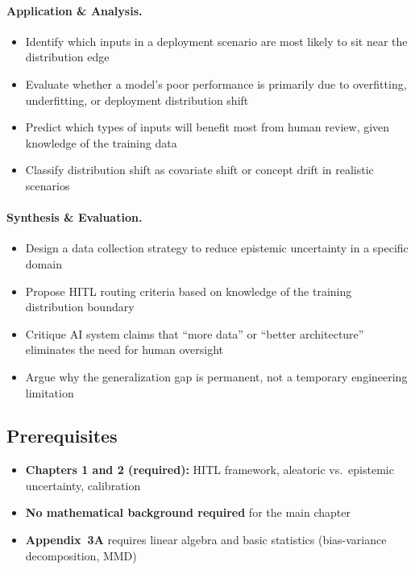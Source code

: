 \paragraph{Application \& Analysis.}
\begin{itemize}
    \item Identify which inputs in a deployment scenario are most likely to sit near the distribution edge
    \item Evaluate whether a model's poor performance is primarily due to overfitting, underfitting, or deployment distribution shift
    \item Predict which types of inputs will benefit most from human review, given knowledge of the training data
    \item Classify distribution shift as covariate shift or concept drift in realistic scenarios
\end{itemize}

\paragraph{Synthesis \& Evaluation.}
\begin{itemize}
    \item Design a data collection strategy to reduce epistemic uncertainty in a specific domain
    \item Propose HITL routing criteria based on knowledge of the training distribution boundary
    \item Critique AI system claims that ``more data'' or ``better architecture'' eliminates the need for human oversight
    \item Argue why the generalization gap is permanent, not a temporary engineering limitation
\end{itemize}

\subsection{Prerequisites}
\begin{itemize}
    \item \textbf{Chapters 1 and 2 (required):} HITL framework, aleatoric vs.\ epistemic uncertainty, calibration
    \item \textbf{No mathematical background required} for the main chapter
    \item \textbf{Appendix~3A} requires linear algebra and basic statistics (bias-variance decomposition, MMD)
\end{itemize}

